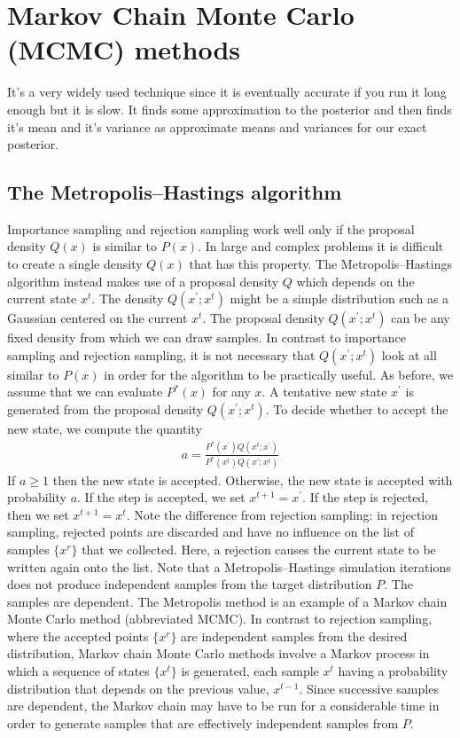 \documentclass[10pt ]{article}
\begin{document}
\section{Markov Chain Monte Carlo (MCMC) methods}
It's a very widely used technique since it is eventually accurate if you run it long enough but it is slow. It finds some approximation to the posterior and then finds it's mean and it's variance as approximate means and variances for our exact posterior. 

\subsection{The Metropolis–Hastings algorithm}

Importance sampling and rejection sampling work well only if the proposal density $Q(x)$ is similar to $P(x)$. In large and complex problems it is difficult to create a single density $Q(x)$ that has this property. The Metropolis–Hastings algorithm instead makes use of a proposal density $Q$ which depends on the current state $x^t$. The density $Q(x^{\prime};x^t)$ might be a simple distribution such as a Gaussian centered on the current $x^t$. The proposal density $Q(x^{\prime};x^t)$ can be any fixed density from which we can draw samples. In contrast to importance sampling and rejection sampling, it is not necessary that $Q(x^{\prime};x^t)$ look at all similar to $P(x)$ in order for the algorithm to be practically useful. As before, we assume that we can evaluate $P^*(x)$ for any $x$. A tentative new state $x^{\prime}$ is generated from the proposal density $Q(x^{\prime};x^t)$. To decide whether to accept the new state, we compute the quantity 
\begin{align}
a = \frac{ P^*(x^{\prime}) Q(x^t;x^{\prime})}{ P^*(x^t) Q(x^{\prime};x^t)}
\label{eq_metropolis_hasting_1}
\end{align}
If $a \ge 1$ then the new state is accepted. Otherwise, the new state is accepted with probability $a$. If the step is accepted, we set $x^{t+1} = x^{\prime}$. If the step is rejected, then we set $x^{t+1} = x^{t}$. Note the difference from rejection sampling: in rejection sampling, rejected points are discarded and have no influence on the list of samples $\{x^r\}$ that we collected. Here, a rejection causes the current state to be written again onto the list. Note that a Metropolis–Hastings simulation iterations does not produce independent samples from the target distribution $P$. The samples are dependent. The Metropolis method is an example of a Markov chain Monte Carlo method (abbreviated MCMC). In contrast to rejection sampling, where the accepted points $\{x^r\}$ are independent samples from the desired distribution, Markov chain Monte Carlo methods involve a Markov process in which a sequence of states $\{x^t\}$ is generated, each sample $x^t$ having a probability distribution that depends on the previous value, $x^{t-1}$. Since successive samples are dependent, the Markov chain may have to be run for a considerable time in order to generate samples that are effectively independent samples from $P$. 
\end{document}
